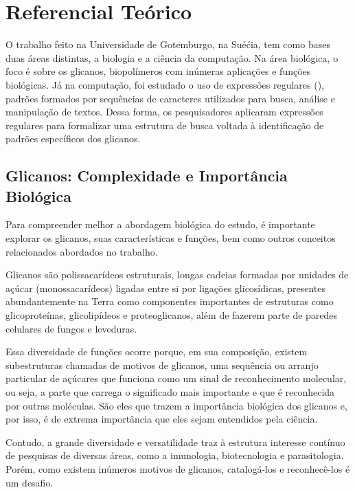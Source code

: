 \chapter{Referencial Teórico}

O trabalho feito na Universidade de Gotemburgo, na Suéćia, tem como bases duas áreas distintas, a biologia e a ciência da computação. Na área biológica, o foco é sobre os glicanos, biopolímeros com inúmeras aplicações e funções biológicas. Já na computação, foi estudado o uso de expressões regulares (), padrões formados por sequências de caracteres utilizados para busca, análise e manipulação de textos. Dessa forma, os pesquisadores aplicaram expressões regulares para formalizar uma estrutura de busca voltada à identificação de padrões específicos dos glicanos.

\section{Glicanos: Complexidade e Importância Biológica}

Para compreender melhor a abordagem biológica do estudo, é importante explorar os glicanos, suas características e funções, bem como outros conceitos relacionados abordados no trabalho.
\begin{definition}
  Glicanos são polissacarídeos estruturais, longas cadeias formadas por unidades de açúcar (monossacarídeos) ligadas entre si por ligações glicosídicas, presentes abundantemente na Terra como componentes importantes de estruturas como glicoproteínas, glicolipídeos e proteoglicanos, além de fazerem parte de paredes celulares de fungos e leveduras.
\end{definition}

Essa diversidade de funções ocorre porque, em sua composição, existem subestruturas chamadas de motivos de glicanos, uma sequência ou arranjo particular de açúcares que funciona como um sinal de reconhecimento molecular, ou seja, a parte que carrega o significado mais importante e que é reconhecida por outras moléculas. São eles que trazem a importância biológica dos glicanos e, por isso, é de extrema importância que eles sejam entendidos pela ciência. 

Contudo, a grande diversidade e versatilidade traz à estrutura interesse contínuo de pesquisas de diversas áreas, como a imunologia, biotecnologia e parasitologia. Porém, como existem inúmeros motivos de glicanos, catalogá-los e reconhecê-los é um desafio.

